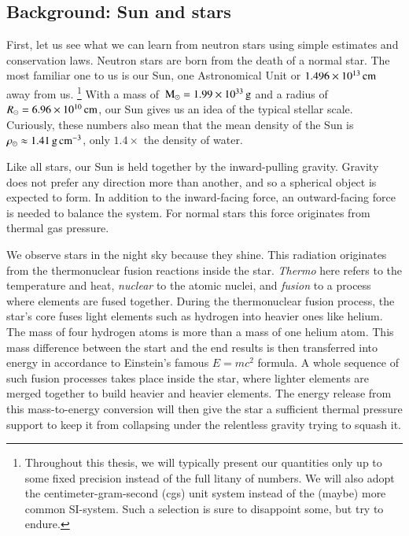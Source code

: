 \subsection{Background: Sun and stars}
First, let us see what we can learn from neutron stars using simple estimates and conservation laws.
Neutron stars are born from the death of a normal star.  %
The most familiar one to us is our Sun, one Astronomical Unit or $1.496 \times 10^{13} \, \mathrm{cm}$ away from us.%
\footnote{Throughout this thesis, we will typically present our quantities only up to some fixed precision instead of the full litany of numbers.
We will also adopt the centimeter-gram-second (cgs) unit system instead of the (maybe) more common SI-system. 
Such a selection is sure to disappoint some, but try to endure.
}
With a mass of $\, \mathrm{M}_{\odot} = 1.99 \times 10^{33} \, \mathrm{g}$ and a radius of $R_{\odot} = 6.96 \times 10^{10} \, \mathrm{cm}$, our Sun gives us an idea of the typical stellar scale.
Curiously, these numbers also mean that the mean density of the Sun is $\rho_{\odot} \approx 1.41 \, \mathrm{g}\,\mathrm{cm}^{-3}$, only $1.4\times$ the density of water.

Like all stars, our Sun is held together by the inward-pulling gravity.
Gravity does not prefer any direction more than another, and so a spherical object is expected to form.
In addition to the inward-facing force, an outward-facing force is needed to balance the system.
For normal stars this force originates from thermal gas pressure.

We observe stars in the night sky because they shine.
This radiation originates from the thermonuclear fusion reactions inside the star.
\emph{Thermo} here refers to the temperature and heat, \emph{nuclear} to the atomic nuclei, and \emph{fusion} to a process where elements are fused together.
During the thermonuclear fusion process, the star's core fuses light elements such as hydrogen into heavier ones like helium.
The mass of four hydrogen atoms is more than a mass of one helium atom.
This mass difference between the start and the end results is then transferred into energy in accordance to Einstein's famous $E = mc^2$ formula.
A whole sequence of such fusion processes takes place inside the star, where lighter elements are merged together to build heavier and heavier elements.
The energy release from this mass-to-energy conversion will then give the star a sufficient thermal pressure support to keep it from collapsing under the relentless gravity trying to squash it.

